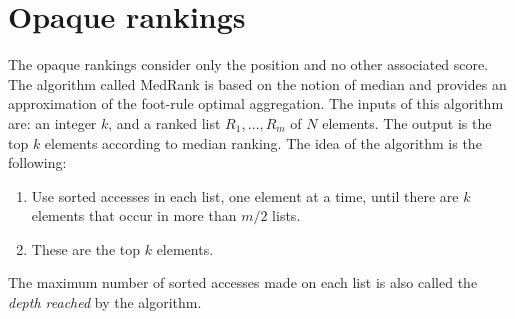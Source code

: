 \documentclass[12pt, a4paper]{report}
\newtheorem[style=M,bodystyle=\normalfont]{theorem}{Theorem}
\newtheorem[style=M,bodystyle=\normalfont]{corollary}{Corollary}
\newtheorem[style=M,bodystyle=\normalfont]{lemma}{Lemma}
\newtheorem[style=M,bodystyle=\normalfont]{definition}{Definition}
\begin{document}
    \section{Opaque rankings}
    The opaque rankings consider only the position and no other associated score. The algorithm called MedRank is based on the notion of 
    median and provides an approximation of the foot-rule optimal aggregation. The inputs of this algorithm are: an integer $k$, and a ranked list 
    $R_1,\dots,R_m$ of $N$ elements. The output is the top $k$ elements according to median ranking. The idea of the algorithm is the following: 
    \begin{enumerate}
        \item Use sorted accesses in each list, one element at a time, until there are $k$ elements that occur in more than $m/2$ lists.
        \item These are the top $k$ elements. 
    \end{enumerate}
    \begin{definition}
        The maximum number of sorted accesses made on each list is also called the \emph{depth reached} by the algorithm. 
    \end{definition}
\end{document}
